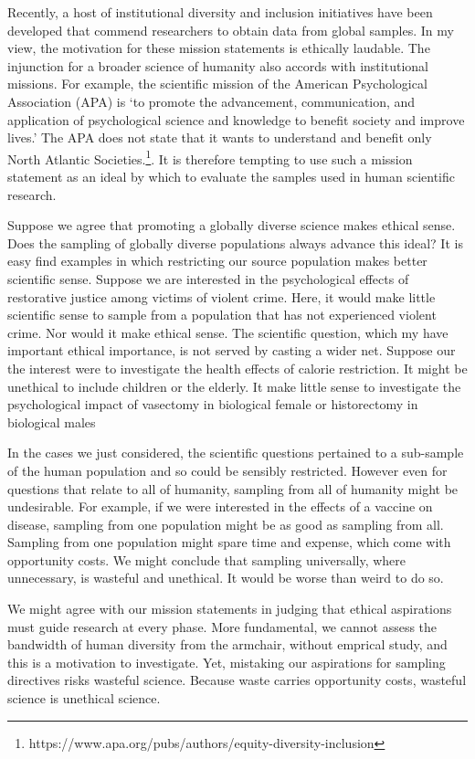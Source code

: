 \documentclass[
  single column]{article}
\begin{document}
Recently, a host of institutional diversity and inclusion initiatives
have been developed that commend researchers to obtain data from global
samples. In my view, the motivation for these mission statements is
ethically laudable. The injunction for a broader science of humanity
also accords with institutional missions. For example, the scientific
mission of the American Psychological Association (APA) is `to promote
the advancement, communication, and application of psychological science
and knowledge to benefit society and improve lives.' The APA does not
state that it wants to understand and benefit only North Atlantic
Societies.\footnote{https://www.apa.org/pubs/authors/equity-diversity-inclusion}.
It is therefore tempting to use such a mission statement as an ideal by
which to evaluate the samples used in human scientific research.

Suppose we agree that promoting a globally diverse science makes ethical
sense. Does the sampling of globally diverse populations always advance
this ideal? It is easy find examples in which restricting our source
population makes better scientific sense. Suppose we are interested in
the psychological effects of restorative justice among victims of
violent crime. Here, it would make little scientific sense to sample
from a population that has not experienced violent crime. Nor would it
make ethical sense. The scientific question, which my have important
ethical importance, is not served by casting a wider net. Suppose our
the interest were to investigate the health effects of calorie
restriction. It might be unethical to include children or the elderly.
It make little sense to investigate the psychological impact of
vasectomy in biological female or historectomy in biological males

In the cases we just considered, the scientific questions pertained to a
sub-sample of the human population and so could be sensibly restricted.
However even for questions that relate to all of humanity, sampling from
all of humanity might be undesirable. For example, if we were interested
in the effects of a vaccine on disease, sampling from one population
might be as good as sampling from all. Sampling from one population
might spare time and expense, which come with opportunity costs. We
might conclude that sampling universally, where unnecessary, is wasteful
and unethical. It would be worse than weird to do so.

We might agree with our mission statements in judging that ethical
aspirations must guide research at every phase. More fundamental, we
cannot assess the bandwidth of human diversity from the armchair,
without emprical study, and this is a motivation to investigate. Yet,
mistaking our aspirations for sampling directives risks wasteful
science. Because waste carries opportunity costs, wasteful science is
unethical science.
\end{document}
